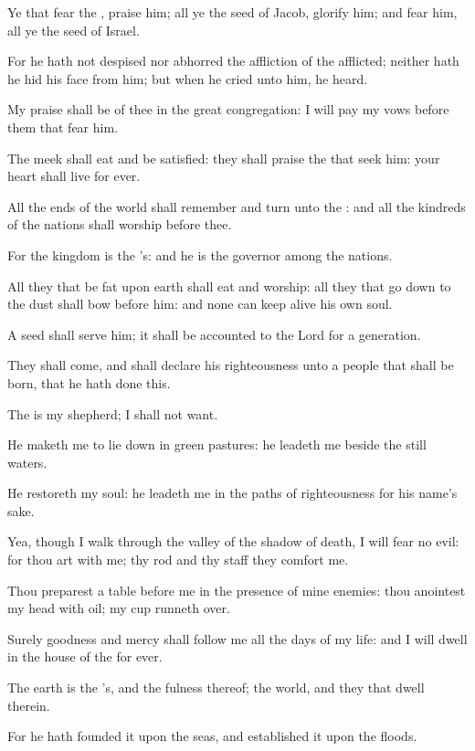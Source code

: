 \Verse Ye that fear the \LORD, praise him; all ye the seed of Jacob, glorify him; and fear him, all ye the seed of Israel.

\Verse For he hath not despised nor abhorred the affliction of the afflicted; neither hath he hid his face from him; but when he cried unto him, he heard.

\Verse My praise shall be of thee in the great congregation: I will pay my vows before them that fear him.

\Verse The meek shall eat and be satisfied: they shall praise the \LORD that seek him: your heart shall live for ever.

\Verse All the ends of the world shall remember and turn unto the \LORD: and all the kindreds of the nations shall worship before thee.

\Verse For the kingdom is the \LORD's: and he is the governor among the nations.

\Verse All they that be fat upon earth shall eat and worship: all they that go down to the dust shall bow before him: and none can keep alive his own soul.

\Verse A seed shall serve him; it shall be accounted to the Lord for a generation.

\Verse They shall come, and shall declare his righteousness unto a people that shall be born, that he hath done this.




\Chapter
\Verse The \LORD is my shepherd; I shall not want.

\Verse He maketh me to lie down in green pastures: he leadeth me beside the still waters.

\Verse He restoreth my soul: he leadeth me in the paths of righteousness for his name's sake.

\Verse Yea, though I walk through the valley of the shadow of death, I will fear no evil: for thou art with me; thy rod and thy staff they comfort me.

\Verse Thou preparest a table before me in the presence of mine enemies: thou anointest my head with oil; my cup runneth over.

\Verse Surely goodness and mercy shall follow me all the days of my life: and I will dwell in the house of the \LORD for ever.




\Chapter
\Verse The earth is the \LORD's, and the fulness thereof; the world, and they that dwell therein.

\Verse For he hath founded it upon the seas, and established it upon the floods.

